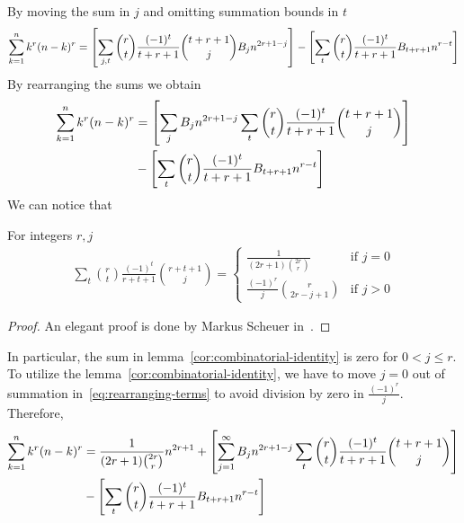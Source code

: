 By moving the sum in $j$ and omitting summation bounds in $t$
\begin{align*}
    \sum_{k=1}^{n} k^{r} (n-k)^{r}
    = \left[ \sum_{j, t} \binom{r}{t} \frac{(-1)^t}{t+r+1} \binom{t+r+1}{j} {B}\sb{j} n^{2r+1-j}  \right]
    - \left[ \sum_{t} \binom{r}{t} \frac{(-1)^t}{t+r+1} {B}\sb{t+r+1} n^{r-t} \right]
\end{align*}
By rearranging the sums we obtain
\begin{align}
    \label{eq:rearranging-terms}
    \sum_{k=1}^{n} k^{r} (n-k)^{r}
    &= \left[ \sum_{j} {B}\sb{j} n^{2r+1-j} \sum_{t} \binom{r}{t} \frac{(-1)^t}{t+r+1} \binom{t+r+1}{j}  \right] \\
    &- \left[ \sum_{t} \binom{r}{t} \frac{(-1)^t}{t+r+1} {B}\sb{t+r+1} n^{r-t} \right] \nonumber
\end{align}
We can notice that
\begin{lemma}
    \label{cor:combinatorial-identity}
    For integers $r, j$
    \begin{align*}
        \sum_{t} \binom{r}{t} \frac{(-1)^t}{r+t+1} \binom{r+t+1}{j}
        =\begin{cases}
             \frac{1}{(2r+1) \binom{2r}r} & \text{if } j=0\\
             \frac{(-1)^r}{j} \binom{r}{2r-j+1} & \text{if } j>0
        \end{cases}
    \end{align*}
    \begin{proof}
        An elegant proof is done by Markus Scheuer in~\cite{scheuer2023mathstackexchange}.
    \end{proof}
\end{lemma}
In particular, the sum in lemma~\eqref{cor:combinatorial-identity} is zero for $0< j \leq r$.
To utilize the lemma~\eqref{cor:combinatorial-identity}, we have to move $j=0$ out of summation
in~\eqref{eq:rearranging-terms} to avoid division by zero in $\frac{(-1)^r}{j}$.
Therefore,
\begin{equation*}
    \begin{split}
        \sum_{k=1}^{n} k^{r} (n-k)^{r}
        &= \frac{1}{(2r+1) \binom{2r}r} n^{2r+1}
        + \left[ \sum_{j = 1}^{\infty} {B}\sb{j} n^{2r+1-j} \sum_{t} \binom{r}{t} \frac{(-1)^t}{t+r+1} \binom{t+r+1}{j} \right] \\
        &- \left[ \sum_{t} \binom{r}{t} \frac{(-1)^t}{t+r+1} {B}\sb{t+r+1} n^{r-t} \right]
    \end{split}
\end{equation*}
